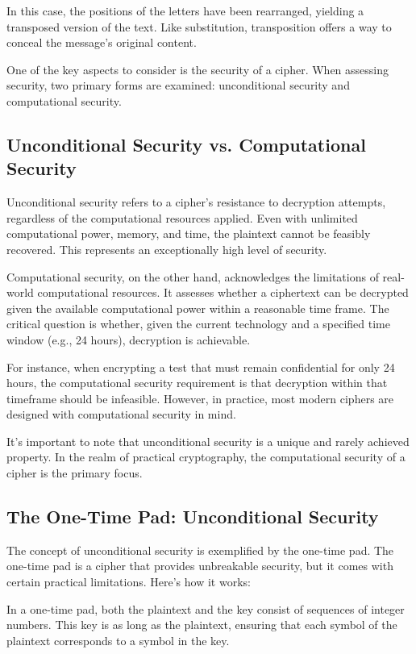 \documentclass{class}
\begin{document}
In this case, the positions of the letters have been rearranged, yielding a transposed version of the text. Like substitution, transposition offers a way to conceal the message's original content.

One of the key aspects to consider is the security of a cipher. When assessing security, two primary forms are examined: unconditional security and computational security.

\subsection{Unconditional Security vs. Computational Security}

Unconditional security refers to a cipher's resistance to decryption attempts, regardless of the computational resources applied. Even with unlimited computational power, memory, and time, the plaintext cannot be feasibly recovered. This represents an exceptionally high level of security.

Computational security, on the other hand, acknowledges the limitations of real-world computational resources. It assesses whether a ciphertext can be decrypted given the available computational power within a reasonable time frame. The critical question is whether, given the current technology and a specified time window (e.g., 24 hours), decryption is achievable.

For instance, when encrypting a test that must remain confidential for only 24 hours, the computational security requirement is that decryption within that timeframe should be infeasible. However, in practice, most modern ciphers are designed with computational security in mind.

It's important to note that unconditional security is a unique and rarely achieved property. In the realm of practical cryptography, the computational security of a cipher is the primary focus.

\subsection{The One-Time Pad: Unconditional Security}

The concept of unconditional security is exemplified by the one-time pad. The one-time pad is a cipher that provides unbreakable security, but it comes with certain practical limitations. Here's how it works:

In a one-time pad, both the plaintext and the key consist of sequences of integer numbers. This key is as long as the plaintext, ensuring that each symbol of the plaintext corresponds to a symbol in the key.
\end{document}
